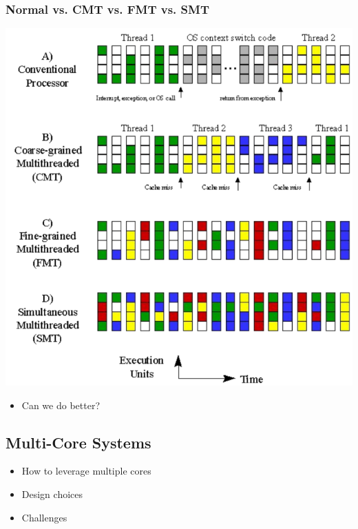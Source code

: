 \documentclass[10pt]{article}
\begin{document}
\subsubsection*{Normal vs. CMT vs. FMT vs. SMT}
\begin{center}
    \includegraphics*[scale=0.7]{W8_3.png}
\end{center}
\begin{itemize}
    \item Can we do better?
\end{itemize}

\subsection*{Multi-Core Systems}
\begin{itemize}
    \item How to leverage multiple cores
    \item Design choices
    \item Challenges
\end{itemize}
\end{document}
